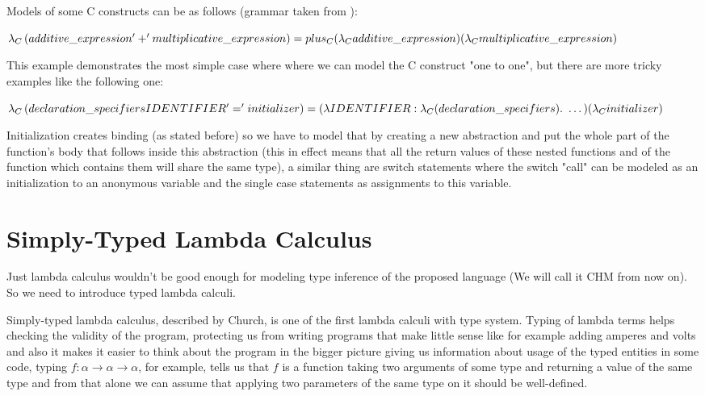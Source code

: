 Models of some C constructs can be as follows (grammar taken from ): %

$\lambda_C\left(additive\_expression '+' multiplicative\_expression\right) = \\ plus_C (\lambda_C additive\_expression) (\lambda_C multiplicative\_expression)$

This example demonstrates the most simple case where  where we can model the C construct "one to one",
but there are more tricky examples like the following one:

$\lambda_C\left(declaration\_specifiers IDENTIFIER '=' initializer\right) = \\ (\lambda IDENTIFIER : \lambda_C(declaration\_specifiers) .\ \dots) (\lambda_C initializer)$

Initialization creates binding (as stated before) so we have to model that by creating a new abstraction and put the whole
part of the function's body that follows inside this abstraction (this in effect means that all the return values of these nested functions
and of the function which contains them will share the same type), a similar thing are switch statements where the switch "call" can be modeled
as an initialization to an anonymous variable and the single case statements as assignments to this variable.

\section{Simply-Typed Lambda Calculus}

Just lambda calculus wouldn't be good enough for modeling type inference of the proposed language (We will call it CHM from now on).
So we need to introduce typed lambda calculi.

Simply-typed lambda calculus, described by Church, is one of the first %
lambda calculi with type system. Typing of lambda terms helps checking the validity of the program, protecting us from writing
programs that make little sense like for example adding amperes and volts %
and also it makes it easier to think about the program in the bigger picture giving us information about usage of the typed entities
in some code, typing $f : \alpha \rightarrow \alpha \rightarrow \alpha$, for example, tells us that $f$ is a function taking two arguments
of some type and returning a value of the same type and from that alone we can assume that applying two parameters of the same type on it
should be well-defined.

